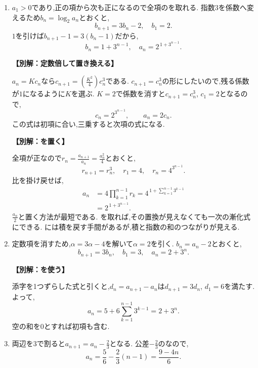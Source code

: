 \begin{enumerate}[label=\textbf{問\arabic*.},leftmargin=3.8em,format=\bookitemlink{practice-basic}{solution}{problem}]
  \item {}\BookMathLayout{}{\\}
    $a_1>0$であり,正の項から次も正になるので全項のを取れる.
    指数$3$を係数へ変えるため$b_n=\log_2a_n$とおくと,
    \[
      b_{n+1}=3b_n-2,\quad b_1=2.
    \]
    $1$を引けば$b_{n+1}-1=3(b_n-1)$だから,
    \[
      b_n=1+3^{n-1},\quad a_n=2^{\,1+3^{n-1}}.
    \]
    \par\smallskip\noindent\textbf{【別解：定数倍して置き換える】}\par
    $a_n=Kc_n$なら$c_{n+1}=\left(\frac{K^2}{4}\right)c_n^3$である.
    $c_{n+1}=c_n^3$の形にしたいので,残る係数が$1$になるように$K$を選ぶ.
    $K=2$で係数を消すと$c_{n+1}=c_n^3$, $c_1=2$となるので,
    \[
      c_n=2^{3^{n-1}},\qquad a_n=2c_n.
    \]
    この式は初項に合い,三乗すると次項の式になる.
    \par\smallskip\noindent\textbf{【別解：を置く】}\par
    全項が正なので$r_n=\frac{a_{n+1}}{a_n}=\frac{a_n^2}{4}$とおくと,
    \[
      r_{n+1}=r_n^3,\quad r_1=4,\quad r_n=4^{3^{n-1}}.
    \]
    比を掛け戻せば,
    \[
      \begin{aligned}
        a_n&=4\prod_{k=1}^{n-1}r_k
          =4^{\,1+\sum_{k=1}^{n-1}3^{k-1}}\\
        &=2^{\,1+3^{n-1}}.
      \end{aligned}
    \]
    $\frac{a_n}{2}$と置く方法が最短である.
    を取れば,その置換が見えなくても一次の漸化式にできる.
    には積を戻す手間があるが,積と指数の和のつながりが見える.

  \item {}\BookMathLayout{}{\\}
    定数項を消すため,$\alpha=3\alpha-4$を解いて$\alpha=2$を引く.
    $b_n=a_n-2$とおくと,
    \[
      b_{n+1}=3b_n,\quad b_1=3,\quad a_n=2+3^n.
    \]
    \par\smallskip\noindent\textbf{【別解：を使う】}\par
    添字を1つずらした式と引くと,$d_n=a_{n+1}-a_n$は$d_{n+1}=3d_n$, $d_1=6$を満たす.
    よって,
    \[
      a_n=5+6\sum_{k=1}^{n-1}3^{k-1}=2+3^n.
    \]
    空の和を$0$とすれば初項も含む.

  \item {}\BookMathLayout{}{\\}
    両辺を$3$で割ると$a_{n+1}=a_n-\frac{2}{3}$となる.
    公差$-\frac{2}{3}$のなので,
    \[
      a_n=\frac56-\frac23(n-1)=\frac{9-4n}{6}.
    \]


\end{enumerate}
